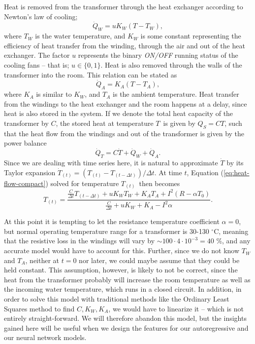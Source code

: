 \documentclass[]{article}
\begin{document}
Heat is removed from the transformer through the heat exchanger according to Newton's law of cooling;
\begin{equation}
	\dot{Q}_W = uK_W (T - T_W),
\end{equation}
where $T_W$ is the water temperature, and $K_W$ is some constant representing the efficiency of heat transfer from the winding, through the air and out of the heat exchanger. The factor $u$ represents the binary \textit{ON/OFF} running status of the cooling fans -- that is; $u \in \{0,1\}$. Heat is also removed through the walls of the transformer into the room. This relation can be stated as
\begin{equation}
	\dot{Q}_A = K_A (T - T_A),
\end{equation}
where $K_A$ is similar to $K_W$, and $T_A$ is the ambient temperature. Heat transfer from the windings to the heat exchanger and the room happens at a delay, since heat is also stored in the system. If we denote the total heat capacity of the transformer by $C$, the stored heat at temperature $T$ is given by $Q_S = CT$, such that the heat flow from the windings and out of the transformer is given by the power balance
\begin{equation} \label{eq:heat-flow-compact}
	\dot{Q}_T = C \dot{T} + \dot{Q}_W + \dot{Q}_A.
\end{equation}
Since we are dealing with time series here, it is natural to approximate $\dot{T}$ by its Taylor expansion $\dot{T}_{(t)} = (T_{(t)} - T_{(t-\Delta t)})/ \Delta t$. At time $t$, Equation (\ref{eq:heat-flow-compact}) solved for temperature $T_{(t)}$ then becomes
\begin{equation} \label{eq:physical-overall}
	T_{(t)} = \frac{\frac{C}{\Delta t} T_{(t-\Delta t)} + uK_W T_W + K_A T_A + I^2 (R - \alpha T_0)}{\frac{C}{\Delta t} + uK_W + K_A - I^2 \alpha}.
\end{equation}

At this point it is tempting to let the resistance temperature coefficient $\alpha = 0$, but normal operating temperature range for a transformer is 30-130 $^\circ$C, meaning that the resistive loss in the windings will vary by $\sim 100 \cdot 4 \cdot 10^{-3} = 40 $ \%, and any accurate model would have to account for this. Further, since we do not know $T_W$ and $T_A$, neither at $t = 0$ nor later, we could maybe assume that they could be held constant. This assumption, however, is likely to not be correct, since the heat from the transformer probably will increase the room temperature as well as the incoming water temperature, which runs in a closed circuit. In addition, in order to solve this model with traditional methods like the Ordinary Least Squares method to find $C, K_W, K_A$, we would have to linearize it -- which is not entirely straight-forward. We will therefore abandon this model, but the insights gained here will be useful when we design the features for our autoregressive and our neural network models.
\end{document}
